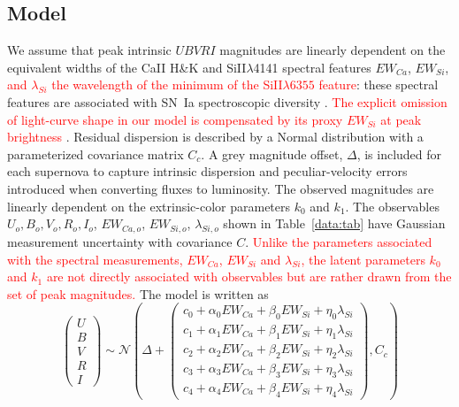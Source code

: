 \documentclass{aastex61}   	%
\begin{document}
\subsection{Model}
We assume 
that  peak intrinsic $UBVRI$ magnitudes are linearly dependent
on the
 equivalent widths of the CaII H\&K and SiII$\lambda$4141 spectral features
$EW_{Ca}$, $EW_{Si}$,
\textcolor{red}{ and $\lambda_{Si}$ the wavelength of the minimum of 
the SiII$\lambda6355$ feature}:
these spectral features are associated with SN~Ia  spectroscopic diversity  
\citep{2006PASP..118..560B, 2008A&A...492..535A, 2009A&A...500L..17B, 2009PASP..121..238B, 2009ApJ...699L.139W, 2011ApJ...729...55F}.
\textcolor{red}{
The explicit omission of light-curve shape in our model is compensated by its proxy
$EW_{Si}$ at peak brightness}
\citep{2008A&A...492..535A, 2011A&A...529L...4C}. 
Residual dispersion is described by a Normal distribution with a parameterized covariance matrix
$C_c$.  A grey magnitude offset, $\Delta$, is included for each supernova
to capture intrinsic dispersion and peculiar-velocity errors introduced when converting fluxes to luminosity.
The observed magnitudes are linearly dependent on the
extrinsic-color parameters $k_0$ and $k_1$.  
The observables
$U_o, B_o, V_o, R_o, I_o$, $EW_{Ca,o}$, $EW_{Si,o}$, $\lambda_{Si,o}$
shown in Table~\ref{data:tab} have Gaussian measurement uncertainty with covariance $C$.
\textcolor{red}{Unlike the parameters associated with
the spectral measurements, $EW_{Ca}$, $EW_{Si}$ and $\lambda_{Si}$,  the latent
parameters $k_0$ and $k_1$ are not directly associated
with observables but are rather drawn from the set of peak magnitudes.}
The model is written as
\begin{equation}
\begin{pmatrix}
U\\B\\V\\R\\I
\end{pmatrix}
\sim \mathcal{N}
\left(
\Delta +
\begin{pmatrix}
c_0+\alpha_0 EW_{Ca} + \beta_0 EW_{Si} + \eta_0 \lambda_{Si} \\
c_1+\alpha_1 EW_{Ca} + \beta_1 EW_{Si} + \eta_1 \lambda_{Si}  \\
c_2+\alpha_2 EW_{Ca} + \beta_2 EW_{Si} + \eta_2 \lambda_{Si} \\
c_3+\alpha_3 EW_{Ca} + \beta_3 EW_{Si} + \eta_3 \lambda_{Si} \\
c_4+\alpha_4 EW_{Ca} + \beta_4 EW_{Si}+ \eta_4 \lambda_{Si}
\end{pmatrix}
,C_{c}
\right)
\label{ewsiv:eqn}
\end{equation}
\end{document}
